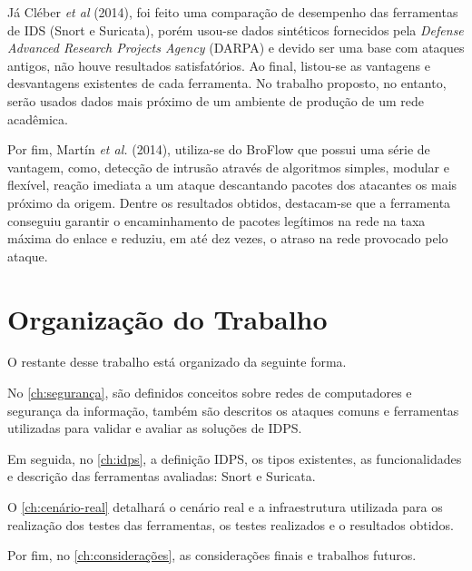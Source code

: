 Já Cléber \textit{et al} (2014), foi feito uma comparação de desempenho das ferramentas de IDS (Snort e Suricata), porém usou-se dados sintéticos fornecidos pela \textit{Defense Advanced Research Projects Agency} (DARPA) e devido ser uma base com ataques antigos, não houve resultados satisfatórios. Ao final, listou-se as vantagens e desvantagens existentes de cada ferramenta. No trabalho proposto, no entanto, serão usados dados mais próximo de um ambiente de produção de um rede acadêmica. 

Por fim, Martín \textit{et al.} (2014), utiliza-se do BroFlow que possui uma série de vantagem, como, detecção de intrusão através de algoritmos simples, modular e flexível, reação imediata a um ataque descantando pacotes dos atacantes os mais próximo da origem. Dentre os resultados obtidos, destacam-se que a ferramenta conseguiu garantir o encaminhamento de pacotes legítimos na rede na taxa máxima do enlace e reduziu, em até dez vezes, o atraso na rede provocado pelo ataque.

\section{Organização do Trabalho} \label{sec:organização-do-trabalho}

O restante desse trabalho está organizado da seguinte forma.

No \autoref{ch:segurança}, são definidos conceitos sobre redes de computadores e segurança da informação, também são descritos os ataques comuns e ferramentas utilizadas para validar e avaliar as soluções de IDPS.

Em seguida, no \autoref{ch:idps}, a definição IDPS, os tipos existentes, as funcionalidades e descrição das ferramentas avaliadas: Snort e Suricata.

O \autoref{ch:cenário-real} detalhará o cenário real e a infraestrutura utilizada para os realização dos testes das ferramentas, os testes realizados e o resultados obtidos.

Por fim, no \autoref{ch:considerações}, as considerações finais e trabalhos futuros.
